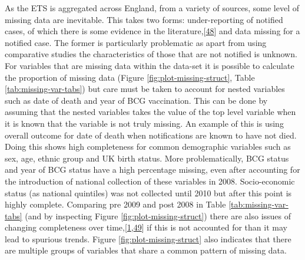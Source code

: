 \documentclass[11pt,twoside]{bristolthesis}
\begin{document}
  As the ETS is aggregated across England, from a variety of sources, some level of missing data are inevitable. This takes two forms: under-reporting of notified cases, of which there is some evidence in the literature,{[}\protect\hyperlink{ref-Pillaye2003}{48}{]} and data missing for a notified case. The former is particularly problematic as apart from using comparative studies the characteristics of those that are not notified is unknown. For variables that are missing data within the data-set it is possible to calculate the proportion of missing data (Figure \ref{fig:plot-missing-struct}, Table \ref{tab:missing-var-tabs}) but care must be taken to account for nested variables such as date of death and year of BCG vaccination. This can be done by assuming that the nested variables takes the value of the top level variable when it is known that the variable is not truly missing. An example of this is using overall outcome for date of death when notifications are known to have not died. Doing this shows high completeness for common demographic variables such as sex, age, ethnic group and UK birth status. More problematically, BCG status and year of BCG status have a high percentage missing, even after accounting for the introduction of national collection of these variables in 2008. Socio-economic status (as national quintiles) was not collected until 2010 but after this point is highly complete. Comparing pre 2009 and post 2008 in Table \ref{tab:missing-var-tabs} (and by inspecting Figure \ref{fig:plot-missing-struct}) there are also issues of changing completeness over time,{[}\protect\hyperlink{ref-PHE2017}{1},\protect\hyperlink{ref-PHE2016}{49}{]} if this is not accounted for than it may lead to spurious trends. Figure \ref{fig:plot-missing-struct} also indicates that there are multiple groups of variables that share a common pattern of missing data.
\end{document}
